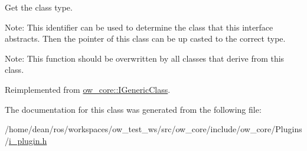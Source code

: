 Get the class type. 

Note\+: This identifier can be used to determine the class that this interface abstracts. Then the pointer of this class can be up casted to the correct type.

Note\+: This function should be overwritten by all classes that derive from this class. 

Reimplemented from \hyperlink{classow__core_1_1IGenericClass_ad6ca32fd7189a4bd71c01c10e3677ae4}{ow\+\_\+core\+::\+I\+Generic\+Class}.



The documentation for this class was generated from the following file\+:\begin{DoxyCompactItemize}
\item 
/home/dean/ros/workspaces/ow\+\_\+test\+\_\+ws/src/ow\+\_\+core/include/ow\+\_\+core/\+Plugins/\hyperlink{i__plugin_8h}{i\+\_\+plugin.\+h}\end{DoxyCompactItemize}
